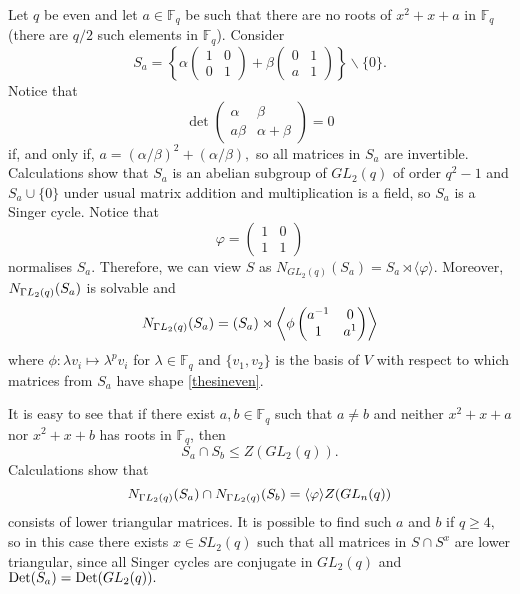 Let $q$ be even and let $a \in \mathbb{F}_q $ be such that there are no roots of $x^2+x+a$ in $\mathbb{F}_q$ (there are $q/2$ such elements in $\mathbb{F}_q$). 
 Consider  
\begin{equation} \label{thesineven}
S_a= \left\{
\alpha \begin{pmatrix}
1    & 0  \\
      0    &   1       
\end{pmatrix} + 
\beta \begin{pmatrix}
0    & 1  \\
a    &  1       
\end{pmatrix}
\right\} \backslash \{0\}.
\end{equation} Notice that 
$$\det \begin{pmatrix}
\alpha    & \beta  \\
    a  \beta    & \alpha +\beta      
\end{pmatrix} =0$$ if, and only if, $a=(\alpha/ \beta)^2 +(\alpha/\beta),$ so all matrices in $S_a$ are invertible. 
 Calculations show that $S_a$ is an abelian subgroup of $GL_2(q)$ of order $q^2-1$ and $S_a \cup \{0\}$ under usual matrix addition and multiplication is a field, so $S_a$ is a Singer cycle. Notice that 
$$\varphi = \begin{pmatrix}
1    & 0  \\
1    &  1       
\end{pmatrix}$$
normalises $S_a.$  Therefore, we can view $S$ as   $N_{GL_2(q)}(S_a)=S_a \rtimes \langle \varphi \rangle$. Moreover, $N_{{{\Gamma L}}_2(q)}(S_a)$ is solvable and 
$$N_{{{\Gamma L}}_2(q)}(S_a)= (S_a) \rtimes \left\langle \phi \begin{pmatrix}
a^{-1}    & 0  \\
1    &  a^1       
\end{pmatrix} \right\rangle$$ 
where $\phi : \lambda v_i \mapsto \lambda^p v_i$ for $\lambda \in \mathbb{F}_q$ and $\{v_1, v_2\}$ is the basis of $V$ with respect  to which matrices from $S_a$ have shape \eqref{thesineven}.

 It is easy to see that if there exist $a, b \in \mathbb{F}_q$ such that $a \ne b$
and neither $x^2+x+a$ nor $x^2+x+b$ has roots in $\mathbb{F}_q$, then $$S_a \cap S_b \le Z(GL_2(q)).$$
Calculations show that  
\begin{equation}
\label{2sindiageven}
N_{{{\Gamma L}}_2(q)}(S_a) \cap N_{{{\Gamma L}}_2(q)}(S_b)=\langle \varphi \rangle Z(GL_n(q))
\end{equation} consists of  lower triangular matrices. It is possible to find such $a$ and $b$ if $q \ge 4,$ so in this case there exists $x \in SL_2(q)$ such that all matrices in $S \cap S^x$ are  lower triangular,   since all Singer cycles are conjugate in $GL_2(q)$ and $\mathrm{Det}(S_a)=\mathrm{Det}(GL_2(q)).$
\medskip




